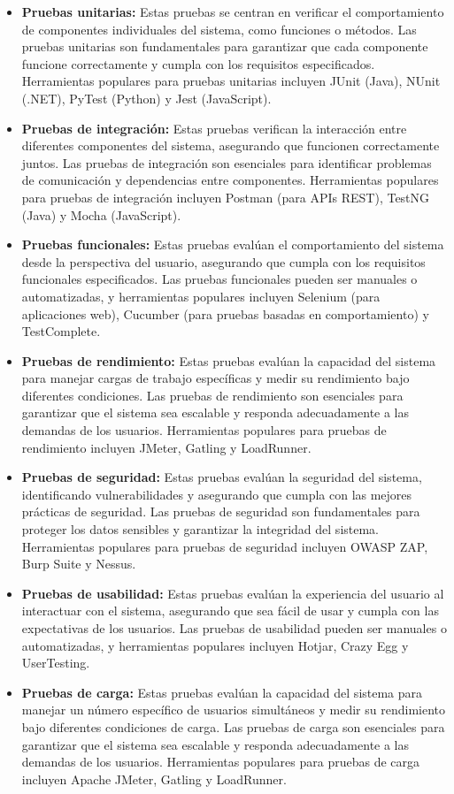 \begin{itemize}
    \item \textbf{Pruebas unitarias:} Estas pruebas se centran en verificar el comportamiento de componentes individuales del sistema, como funciones o métodos. Las pruebas unitarias son fundamentales para garantizar que cada componente funcione correctamente y cumpla con los requisitos especificados. Herramientas populares para pruebas unitarias incluyen JUnit (Java), NUnit (.NET), PyTest (Python) y Jest (JavaScript).
    \item \textbf{Pruebas de integración:} Estas pruebas verifican la interacción entre diferentes componentes del sistema, asegurando que funcionen correctamente juntos. Las pruebas de integración son esenciales para identificar problemas de comunicación y dependencias entre componentes. Herramientas populares para pruebas de integración incluyen Postman (para APIs REST), TestNG (Java) y Mocha (JavaScript).
    \item \textbf{Pruebas funcionales:} Estas pruebas evalúan el comportamiento del sistema desde la perspectiva del usuario, asegurando que cumpla con los requisitos funcionales especificados. Las pruebas funcionales pueden ser manuales o automatizadas, y herramientas populares incluyen Selenium (para aplicaciones web), Cucumber (para pruebas basadas en comportamiento) y TestComplete.
    \item \textbf{Pruebas de rendimiento:} Estas pruebas evalúan la capacidad del sistema para manejar cargas de trabajo específicas y medir su rendimiento bajo diferentes condiciones. Las pruebas de rendimiento son esenciales para garantizar que el sistema sea escalable y responda adecuadamente a las demandas de los usuarios. Herramientas populares para pruebas de rendimiento incluyen JMeter, Gatling y LoadRunner.
    \item \textbf{Pruebas de seguridad:} Estas pruebas evalúan la seguridad del sistema, identificando vulnerabilidades y asegurando que cumpla con las mejores prácticas de seguridad. Las pruebas de seguridad son fundamentales para proteger los datos sensibles y garantizar la integridad del sistema. Herramientas populares para pruebas de seguridad incluyen OWASP ZAP, Burp Suite y Nessus.
    \item \textbf{Pruebas de usabilidad:} Estas pruebas evalúan la experiencia del usuario al interactuar con el sistema, asegurando que sea fácil de usar y cumpla con las expectativas de los usuarios. Las pruebas de usabilidad pueden ser manuales o automatizadas, y herramientas populares incluyen Hotjar, Crazy Egg y UserTesting.
    \item \textbf{Pruebas de carga:} Estas pruebas evalúan la capacidad del sistema para manejar un número específico de usuarios simultáneos y medir su rendimiento bajo diferentes condiciones de carga. Las pruebas de carga son esenciales para garantizar que el sistema sea escalable y responda adecuadamente a las demandas de los usuarios. Herramientas populares para pruebas de carga incluyen Apache JMeter, Gatling y LoadRunner.
\end{itemize}